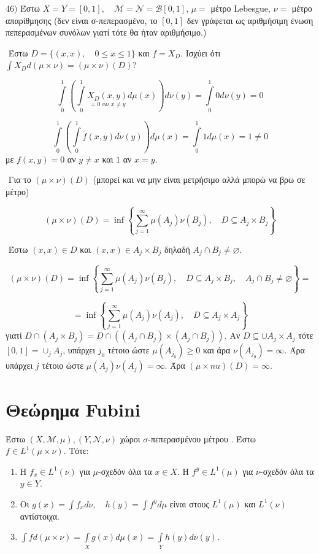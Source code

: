 $46)$ Έστω $ X = Y  = [0,1], \quad \mathcal M = \mathcal N = \mathcal B [0,1]$, $\mu = $ μέτρο {\eng Lebesgue}, $\nu =$ μέτρο απαρίθμησης (δεν είναι σ-πεπερασμένο, το $[0,1]$ δεν γράφεται ως αριθμήσιμη ένωση πεπερασμένων συνόλων γιατί τότε θα ήταν αριθμήσιμο.)

$ $\newline
Έστω $D = \{(x,x), \quad 0\leq x \leq 1\}$ και $f = X_D$. Ισχύει ότι $\int X_D d(\mu \times \nu) = (\mu \times \nu) (D)$?

$$\int\limits_{0}^1 \left( \int\limits_{0}^1 \underset{ = 0 \text{ αν } x\neq y }{X_D (x,y)} d\mu(x) \right) d\nu(y) = \int \limits_0^1 0 d\nu(y) = 0$$

$$\int\limits_{0}^1 \left( \int \limits_0^1 f(x,y) d\nu(y)\right) d\mu(x) = \int\limits_0^1 1 d\mu(x) = 1 \neq 0$$ με $f(x,y) = 0$ αν $y\neq x$ και $1$ αν $x=y$.

$ $\newline
Για το $(\mu \times \nu)(D)$ (μπορεί και να μην είναι μετρήσιμο αλλά μπορώ να βρω σε μέτρο)

$$(\mu \times \nu)(D) = \inf \left\{ \sum\limits_{j=1}^{\infty} \mu (A_j) \nu (B_j), \quad D\subseteq A_j \times B_j \right\}$$

$ $\newline
Έστω $(x,x) \in D$ και $(x,x) \in A_j \times B_j$ δηλαδή $A_j \cap B_j \neq \varnothing$.

$$(\mu \times \nu) (D) = \inf \left\{ \sum\limits_{j=1}^{\infty} \mu (A_j) \nu (B_j), \quad D\subseteq A_j \times B_j, \quad A_j \cap B_j \neq \varnothing \right\} = $$

$$ = \inf \left\{ \sum\limits_{j=1}^{\infty} \mu(A_j) \nu(A_j), \quad D\subseteq A_j \times A_j \right\}$$ γιατί $D\cap ( A_j \times B_j) = D\cap \left( (A_j \cap B_j) \times (A_j \cap B_j) \right)$. Αν $D \subseteq \cup A_j \times A_j$ τότε $[0,1] = \cup_j A_j$, υπάρχει $j_0$ τέτοιο ώστε $\mu (A_{j_0}) \geq 0$ και άρα $\nu (A_{j_0}) = \infty$. Άρα υπάρχει $j$ τέτοιο ώστε $\mu(A_j) \nu(A_j) =\infty$. Άρα $(\mu \times nu)(D) = \infty$.

\pagebreak
\section{Θεώρημα {\eng Fubini}}

\begin{theorem} Έστω $(X, \mathcal M, \mu), (Y,\mathcal N, \nu)$ χώροι $\sigma$-πεπερασμένου μέτρου . Έστω $f \in L^1 (\mu \times \nu)$. Τότε:
    \begin{enumerate}
    \item Η $f_x \in L^1(\nu)$ για $\mu$-σχεδόν όλα τα $x \in X$. Η $f^y \in L^1(\mu)$ για $\nu$-σχεδόν όλα τα $y \in Y$.

    \item Οι $g(x) = \int f_x d\nu, \quad h(y) = \int f^y d\mu$ είναι στους $L^1(\mu)$ και $L^1(\nu)$ αντίστοιχα.

    \item $\int f d(\mu \times \nu) = \int\limits_X g(x) d\mu(x) = \int\limits_Y h(y) d\nu(y)$.
    \end{enumerate}
\end{theorem}


